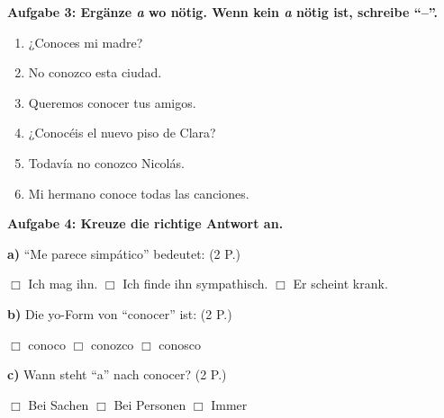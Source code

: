 \documentclass[11pt,a4paper]{article}
\newcommand{\luecke}[1]{\underline{\hspace{#1}}}
\newcommand{\punktebox}[1]{\hfill\fbox{\small \_/#1}}
\begin{document}
\vspace{0.5cm}

\textbf{Aufgabe 3: Ergänze \textit{a} wo nötig. Wenn kein \textit{a} nötig ist, schreibe ``--''.} \punktebox{6}

\begin{enumerate}[label=\alph)]
    \item ¿Conoces \luecke{1cm} mi madre?
    \item No conozco \luecke{1cm} esta ciudad.
    \item Queremos conocer \luecke{1cm} tus amigos.
    \item ¿Conocéis \luecke{1cm} el nuevo piso de Clara?
    \item Todavía no conozco \luecke{1cm} Nicolás.
    \item Mi hermano conoce \luecke{1cm} todas las canciones.
\end{enumerate}

\vspace{0.5cm}

\textbf{Aufgabe 4: Kreuze die richtige Antwort an.} \punktebox{6}

\textbf{a)} ``Me parece simpático'' bedeutet: \hfill (2 P.)

$\Box$ Ich mag ihn. \hspace{1cm} $\Box$ Ich finde ihn sympathisch. \hspace{1cm} $\Box$ Er scheint krank.

\vspace{0.4cm}

\textbf{b)} Die yo-Form von ``conocer'' ist: \hfill (2 P.)

$\Box$ conoco \hspace{1cm} $\Box$ conozco \hspace{1cm} $\Box$ conosco

\vspace{0.4cm}

\textbf{c)} Wann steht ``a'' nach conocer? \hfill (2 P.)

$\Box$ Bei Sachen \hspace{1cm} $\Box$ Bei Personen \hspace{1cm} $\Box$ Immer
\end{document}
